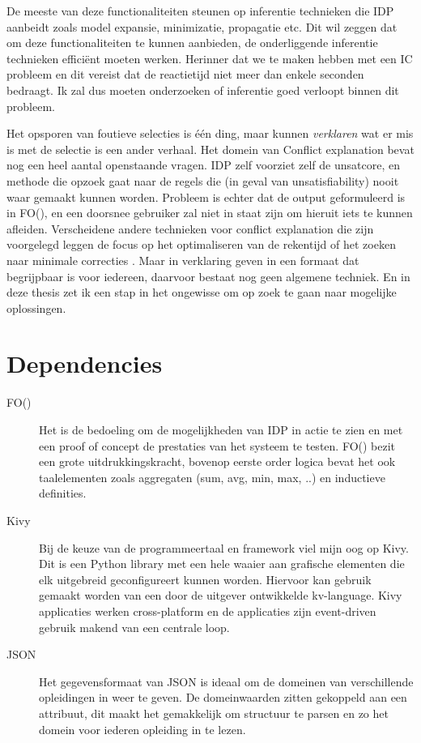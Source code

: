 De meeste van deze functionaliteiten steunen op inferentie technieken die IDP aanbeidt zoals model expansie, minimizatie, propagatie etc. Dit wil zeggen dat om deze functionaliteiten te kunnen aanbieden, de onderliggende inferentie technieken effici\"{e}nt moeten werken. Herinner dat we te maken hebben met een IC probleem en dit vereist dat de reactietijd niet meer dan enkele seconden bedraagt. Ik zal dus moeten onderzoeken of inferentie goed verloopt binnen dit probleem.

Het opsporen van foutieve selecties is \'{e}\'{e}n ding, maar kunnen \emph{verklaren} wat er mis is met de selectie is een ander verhaal. 
Het domein van Conflict explanation bevat nog een heel aantal openstaande vragen. IDP zelf voorziet zelf de unsatcore, en methode die opzoek gaat naar de regels die (in geval van unsatisfiability) nooit waar gemaakt kunnen worden. Probleem is echter dat de output geformuleerd is in FO(\textperiodcentered), en een doorsnee gebruiker zal niet in staat zijn om hieruit iets te kunnen afleiden. Verscheidene andere technieken voor conflict explanation die zijn voorgelegd leggen de focus op het optimaliseren van de rekentijd \citep{amilhastre2002consistency} of het zoeken naar minimale correcties \citep{o2005generating}. Maar in verklaring geven in een formaat dat begrijpbaar is voor iedereen, daarvoor bestaat nog geen algemene techniek. En in deze thesis zet ik een stap in het ongewisse om op zoek te gaan naar mogelijke oplossingen.


\section{Dependencies}
\begin{description}
\item [FO(\textperiodcentered)] Het is de bedoeling om de mogelijkheden van IDP in actie te zien en met een proof of concept de prestaties van het systeem te testen. FO(\textperiodcentered) bezit een grote uitdrukkingskracht, bovenop eerste order logica bevat het ook taalelementen zoals aggregaten (sum, avg, min, max, ..) en inductieve definities. 
\item [Kivy] Bij de keuze van de programmeertaal en framework viel mijn oog op Kivy. Dit is een Python library met een hele waaier aan grafische elementen die elk uitgebreid geconfigureert kunnen worden. Hiervoor kan gebruik gemaakt worden van een door de uitgever ontwikkelde kv-language. Kivy applicaties werken cross-platform en de applicaties zijn event-driven gebruik makend van een centrale loop.
\item [JSON] Het gegevensformaat van JSON is ideaal om de domeinen van verschillende opleidingen in weer te geven. De domeinwaarden zitten gekoppeld aan een attribuut, dit maakt het gemakkelijk om structuur te parsen en zo het domein voor iederen opleiding in te lezen.
\end{description}